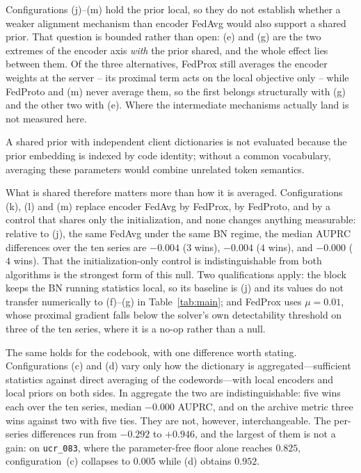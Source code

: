 \documentclass[conference]{IEEEtran}
\begin{document}
Configurations (j)--(m) hold the prior local, so they do not establish whether a weaker alignment mechanism than encoder FedAvg would also support a shared prior. That question is bounded rather than open: (e) and (g) are the two extremes of the encoder axis \emph{with} the prior shared, and the whole effect lies between them. Of the three alternatives, FedProx still averages the encoder weights at the server -- its proximal term acts on the local objective only -- while FedProto and (m) never average them, so the first belongs structurally with (g) and the other two with (e). Where the intermediate mechanisms actually land is not measured here.

A shared prior with independent client dictionaries is not evaluated because the prior embedding is indexed by code identity; without a common vocabulary, averaging these parameters would combine unrelated token semantics.

What is shared therefore matters more than how it is averaged. Configurations (k), (l) and (m) replace encoder FedAvg by FedProx, by FedProto, and by a control that shares only the initialization, and none changes anything measurable: relative to (j), the same FedAvg under the same BN regime, the median AUPRC differences over the ten series are $-0.004$ ($3$ wins), $-0.004$ ($4$ wins), and $-0.000$ ($4$ wins). That the initialization-only control is indistinguishable from both algorithms is the strongest form of this null. Two qualifications apply: the block keeps the BN running statistics local, so its baseline is (j) and its values do not transfer numerically to (f)--(g) in Table~\ref{tab:main}; and FedProx uses $\mu=0.01$, whose proximal gradient falls below the solver's own detectability threshold on three of the ten series, where it is a no-op rather than a null.

The same holds for the codebook, with one difference worth stating. Configurations (c) and (d)
vary only how the dictionary is aggregated---sufficient statistics against direct averaging of the
codewords---with local encoders and local priors on both sides. In aggregate the two are
indistinguishable: five wins each over the ten series, median $-0.000$ AUPRC, and on the archive
metric three wins against two with five ties. They are not, however, interchangeable. The
per-series differences run from $-0.292$ to $+0.946$, and the largest of them is not a gain: on
\texttt{ucr\_083}, where the parameter-free floor alone reaches $0.825$, configuration~(c)
collapses to $0.005$ while (d) obtains $0.952$.
\end{document}
